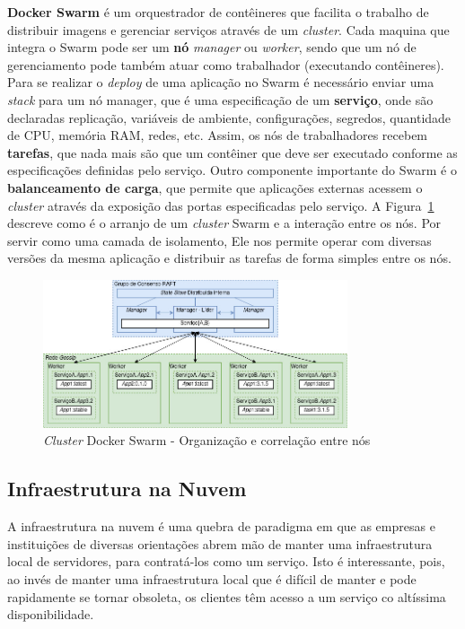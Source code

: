 \documentclass[12pt]{article}
\begin{document}
\textbf{Docker Swarm} é um orquestrador de contêineres que facilita o trabalho de distribuir imagens e gerenciar serviços através de um \textit{cluster}. Cada maquina que integra o Swarm pode ser um \textbf{nó} \textit{manager} ou \textit{worker}, sendo que um nó de gerenciamento pode também atuar como trabalhador (executando contêineres). Para se realizar o \textit{deploy} de uma aplicação no Swarm é necessário enviar uma \textit{stack} para um nó manager, que é uma especificação de um \textbf{serviço}, onde são declaradas replicação, variáveis de ambiente, configurações, segredos, quantidade de CPU, memória RAM, redes, etc. Assim, os nós de trabalhadores recebem \textbf{tarefas}, que nada mais são que um contêiner que deve ser executado conforme as especificações definidas pelo serviço. Outro componente importante do Swarm é o \textbf{balanceamento de carga}, que permite que aplicações externas acessem o \textit{cluster} através da exposição das portas especificadas pelo serviço. A Figura~\ref{fig:swarmCluster} descreve como é o arranjo de um \textit{cluster} Swarm e a interação entre os nós. Por servir como uma camada de isolamento, Ele nos permite operar com diversas versões da mesma aplicação e distribuir as tarefas de forma simples entre os nós.

\begin{figure}[ht]
    \centering
    \includegraphics[width=0.8\textwidth]{images/swarmCluster.jpg}
    \caption{\textit{Cluster} Docker Swarm - Organização e correlação entre nós}
    \label{fig:swarmCluster}
\end{figure}




\subsection{Infraestrutura na Nuvem}
A infraestrutura na nuvem é uma quebra de paradigma em que as empresas e instituições de diversas orientações abrem mão de manter uma infraestrutura local de servidores, para contratá-los como um serviço. Isto é interessante, pois, ao invés de manter uma infraestrutura local que é difícil de manter e pode rapidamente se tornar obsoleta, os clientes têm acesso a um serviço co altíssima disponibilidade. %
\end{document}

